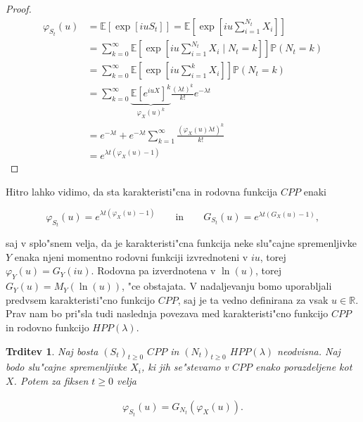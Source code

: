 \documentclass[12pt, a4paper, reqno]{amsart}
\theoremstyle{definition}
\theoremstyle{plain}
\newtheorem{trditev}[definicija]{Trditev}
\newcommand{\R}{\mathbb{R}}
\newcommand{\E}{\mathbb{E}}
\newcommand{\Prob}{\mathbb{P}}
\newcommand{\1}{\mathds{1}}
\begin{document}
    \begin{proof}
        \begin{align}
            \varphi_{S_t}(u) 
                    &= \E\left[\exp\left[iuS_t\right]\right] = \nonumber
                        \E\left[\exp\left[iu\sum_{i = 1}^{N_t}X_i\right]\right] \nonumber\\
                    &= \sum_{k=0}^{\infty}
                        \E\left[\exp\left[iu\sum_{i = 1}^{N_t}X_i\mid N_t=k\right]\right]\Prob\left(N_t = k\right) \nonumber \\ 
                    &= \sum_{k=0}^{\infty}
                        \E\left[\exp\left[iu\sum_{i = 1}^kX_i\right]\right]\Prob\left(N_t = k\right) \nonumber \\
                    &= \sum_{k=0}^{\infty}
                        \underbrace{\E\left[e^{iuX}\right]^k}_{\varphi_X(u)^k}\frac{(\lambda t)^k}{k!}e^{-\lambda t} \label{eq:MomentS_t}\\ 
                    &= e^{-\lambda t} + e^{-\lambda t}\sum_{k=1}^\infty\frac{\left(\varphi_X(u)\lambda t\right)^k}{k!} \nonumber \\
                    &= e^{\lambda t\left(\varphi_X(u) - 1\right)} \nonumber
        \end{align}
    \end{proof}

    Hitro lahko vidimo, da sta karakteristi"cna in rodovna funkcija $CPP$ enaki

    \begin{equation*}
        \varphi_{S_t}(u) = e^{\lambda t\left(\varphi_X(u) - 1\right)} \qquad \text{in} \qquad 
        G_{S_t}(u) = e^{\lambda t\left(G_X(u) - 1\right)},
    \end{equation*} 

    \noindent
    saj v splo"snem velja, da je karakteristi"cna funkcija neke slu"cajne spremenljivke $Y$ enaka
    njeni momentno rodovni funkciji izvrednoteni v $iu$, torej $\varphi_Y(u) = G_Y(iu)$. Rodovna pa 
    izverdnotena v $\ln(u)$, torej $G_Y(u) = M_Y(\ln(u))$, "ce obstajata.
    V nadaljevanju bomo uporabljali predvsem karakteristi"cno funkcijo $CPP$, saj je ta vedno definirana 
    za vsak $u\in\R$. Prav nam bo pri"sla tudi naslednja povezava med karakteristi"cno funkcijo $CPP$ 
    in rodovno funkcijo $HPP(\lambda)$.
    \begin{trditev}
        Naj bosta $(S_t)_{t\geq0}$ $CPP$ in $(N_t)_{t\geq0}$ $HPP(\lambda)$ neodvisna. 
        Naj bodo slu"cajne spremenljivke $X_i$, ki jih se"stevamo v $CPP$ enako porazdeljene kot $X$. 
        Potem za fiksen $t\geq0$ velja

        \begin{align*}
            \varphi_{S_t}(u) = G_{N_t}\left(\varphi_{X}(u)\right).
        \end{align*}

        \label{trd:povezavaRodovneKarkateristicne}
    \end{trditev}
\end{document}
